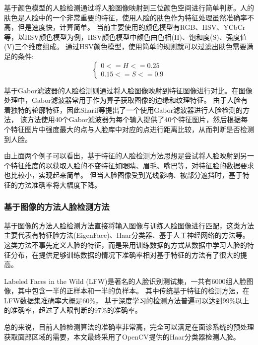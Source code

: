基于颜色模型的人脸检测通过将人脸图像映射到三位颜色空间进行简单判断。人的肤色是人脸中的一个非常重要的特征，使用人脸的肤色作为特征处理虽然准确率不高，但是速度快，计算简单。
当前主要使用的颜色模型有RGB、HSV、YCbCr等，以HSV颜色模型为例，HSV颜色模型中颜色由色相(H)、饱和度(S)、强度值(V)三个维度组成。
通过HSV颜色模型，使用简单的规则就可以过滤出肤色需要满足的条件: 
$$
\left\{ 
\begin{array}{c}
    0 <= H <= 0.25 \\ 
    0.15 <= S <= 0.9
\end{array}
\right. 
$$

基于Gabor滤波器的人脸检测则通过将人脸图像映射到特征图像进行对比。在图像处理中，Gabor滤波器常用于作为算子获取图像的边缘和纹理特征\cite{sahib2020hybrid}。
由于人脸有着独特的轮廓特征，因此Sharif等\cite{sharif2011face}提出了一个使用Gabor滤波器进行人脸检测的方法，
该方法使用40个Gabor滤波器为每个输入提供了40个特征图片，然后根据每个特征图片中强度最大的点与人脸库中对应的点进行距离比较，从而判断是否检测到人脸。

由上面两个例子可以看出，基于特征的人脸检测方法思想是尝试将人脸映射到另一个特征维度的以获取人脸的不变特征如眼睛、眉毛、嘴巴等，对特征脸的数据要求也比较小，实现起来简单。
但当人脸图像受到光线影响、被部分遮挡时，基于特征的方法准确率将大幅度下降。

\subsubsection{基于图像的方法人脸检测方法}
基于图像的方法人脸检测方法直接将输入图像与训练人脸图像进行匹配，这类方法主要代表有特征脸方法(EigenFace)\cite{mulyono2019performance}、Haar分类器\cite{priadana2019face}、基于人工神经网络\cite{farfade2015multi}的方法等。
这类方法不事先定义人脸的特征，而是采用训练数据的方式从数据中学习人脸的特征分布，在提供足够训练数据的情况下准确率相对基于特征的方法有了很大的提高。

Labeled Faces in the Wild (LFW)是著名的人脸识别测试集，一共有6000组人脸图像，其中包含一半的正样本和一半的负样本。
其中传统基于特征的检测方法，在LFW数据集准确率大概是60\%， 基于深度学习的检测方法普遍可以达到99\%以上的准确率，超过了人眼判断的97\%的准确率\cite{sun2015deeply}。

总的来说，目前人脸检测算法的准确率非常高，完全可以满足在面诊系统的预处理获取面部区域的需要，本文最终采用了OpenCV提供的Haar分类器检测人脸。

